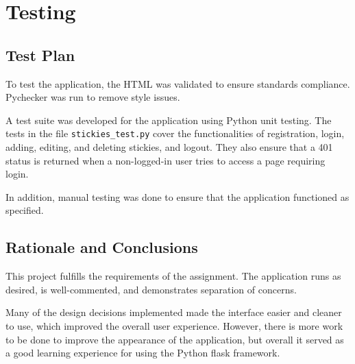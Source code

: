 \documentclass[11pt,letterpaper]{article}
\begin{document}
\section{Testing}

\subsection{Test Plan}
To test the application, the HTML was validated to ensure standards compliance. Pychecker was run to remove style issues.

A test suite was developed for the application using Python unit testing. The tests in the file \texttt{stickies\_test.py} cover the functionalities of registration, login, adding, editing, and deleting stickies, and logout. They also ensure that a 401 status is returned when a non-logged-in user tries to access a page requiring login.

In addition, manual testing was done to ensure that the application functioned as specified.

\subsection{Rationale and Conclusions}
This project fulfills the requirements of the assignment. The application runs as desired, is well-commented, and demonstrates separation of concerns.

Many of the design decisions implemented made the interface easier and cleaner to use, which improved the overall user experience. However, there is more work to be done to improve the appearance of the application, but overall it served as a good learning experience for using the Python flask framework.
\end{document}
